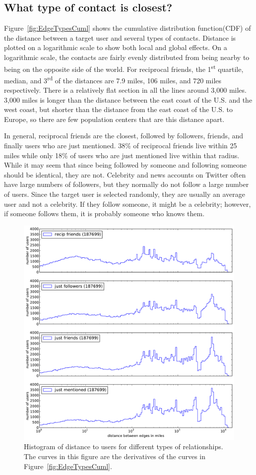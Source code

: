 \documentclass[letterpaper]{article}
\newcommand{\flsec}[1]{\subsection{#1}}
\begin{document}
\flsec{What type of contact is closest?}
\label{sec:EdgeTypes}

Figure~\ref{fig:EdgeTypesCuml} shows the cumulative distribution
function(CDF) of the distance between a target user and several types of
contacts.
%
Distance is plotted on a logarithmic scale to show both local and
global effects.
%
On a logarithmic scale, the contacts are fairly evenly distributed from being
nearby to being on the opposite side of the world.
%
For reciprocal friends, the 1\textsuperscript{st} quartile, median, and
3\textsuperscript{rd} of the distances are 7.9 miles, 106 miles, and 720 miles
respectively.
%
There is a relatively flat section in all the lines around 3,000 miles.
%
3,000 miles is longer than the distance between the east coast of the U.S. and
the west coast, but shorter than the distance from the east coast of the U.S.
to Europe, so there are few population centers that are this distance apart.

In general, reciprocal friends are the closest, followed by followers, friends,
and finally users who are just mentioned.
%
38\% of reciprocal friends live within 25 miles while only 18\% of users
who are just mentioned live within that radius.
%
While it may seem that since being followed by someone and following someone
should be identical, they are not.
%
Celebrity and news accounts on Twitter often have large numbers of followers,
but they normally do not follow a large number of users.
%
Since the target user is selected randomly, they are usually an average
user and not a celebrity.
%
If they follow someone, it might be a celebrity; however, if someone follows
them, it is probably someone who knows them.

\begin{figure}[tbh]
\centering
\includegraphics[width=.9\linewidth]{figures/edge_types_norm.pdf}
\caption{
Histogram of distance to users for different types of relationships.
The curves in this figure are the derivatives of the curves in
Figure~\ref{fig:EdgeTypesCuml}.
}
\label{fig:EdgeTypes}
\end{figure}
\end{document}
